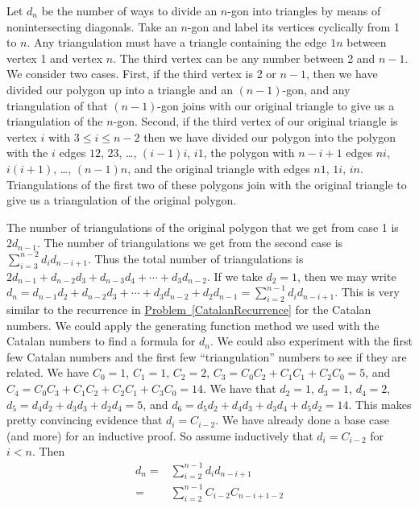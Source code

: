 \documentclass[10pt,]{book}
\theoremstyle{plain}
\theoremstyle{definition}
\theoremstyle{definition}
\numberwithin{equation}{chapter}
\newcommand{\lt}{<}
\newcommand{\amp}{&}
\begin{document}
\begin{exerciselist}
Let \(d_n\) be the number of ways to divide an \(n\)-gon into triangles by means of nonintersecting diagonals. Take an \(n\)-gon and label its vertices cyclically from 1 to \(n\). Any triangulation must have a triangle containing the edge \(1n\) between vertex 1 and vertex \(n\). The third vertex can be any number between 2 and \(n-1\). We consider two cases. First, if the third vertex is 2 or \(n-1\), then we have divided our polygon up into a triangle and an \((n-1)\)-gon, and any triangulation of that \((n-1)\)-gon joins with our original triangle to give us a triangulation of the \(n\)-gon. Second, if the third vertex of our original triangle is vertex \(i\) with \(3\le i\le n-2\) then we have divided our polygon into the polygon with the \(i\) edges \(12\), \(23\), \dots{}, \((i-1)i\), \(i1\), the polygon with \(n-i+1\) edges \(ni\), \(i(i+1)\), \dots{}, \((n-1)n\), and the original triangle with edges \(n1\), \(1i\), \(in\). Triangulations of the first two of these polygons join with the original triangle to give us a triangulation of the original polygon.%
\par
The number of triangulations of the original polygon that we get from case 1 is \(2d_{n-1}\). The number of triangulations we get from the second case is \(\sum_{i=3}^{n-2} d_id_{n-i+1}\). Thus the total number of triangulations is \(2d_{n-1}+d_{n-2}d_3 + d_{n-3}d_4 +\cdots + d_3d_{n-2}\). If we take \(d_2=1\), then we may write \(d_n = d_{n-1}d_2+d_{n-2}d_3 +\cdots+d_3d_{n-2} + d_2d_{n-1}=\sum\limits_{i=2}^{n-1} d_id_{n-i+1}\). This is very similar to the recurrence in \hyperref[CatalanRecurrence]{Problem~\ref{CatalanRecurrence}} for the Catalan numbers. We could apply the generating function method we used with the Catalan numbers to find a formula for \(d_n\). We could also experiment with the first few Catalan numbers and the first few ``triangulation'' numbers to see if they are related. We have \(C_0=1\), \(C_1=1\), \(C_2=2\), \(C_3=C_0C_2+C_1C_1 +C_2C_0=5\), and \(C_4=C_0C_3+C_1C_2+C_2C_1+C_3C_0=14\). We have that \(d_2=1\), \(d_3=1\), \(d_4=2\), \(d_5=d_4d_2+d_3d_3+d_2d_4=5\), and \(d_6=d_5d_2+d_4d_3+d_3d_4+d_5d_2=14\). This makes pretty convincing evidence that \(d_i= C_{i-2}\). We have already done a base case (and more) for an inductive proof. So assume inductively that \(d_{i}=C_{i-2}\) for \(i\lt n\). Then%
\begin{align*}
d_n =\amp \sum\limits_{i=2}^{n-1} d_id_{n-i+1}\\
=\amp \sum\limits_{i=2}^{n-1} C_{i-2}C_{n-i+1-2}\\

\end{align*}
\end{exerciselist}
\end{document}
